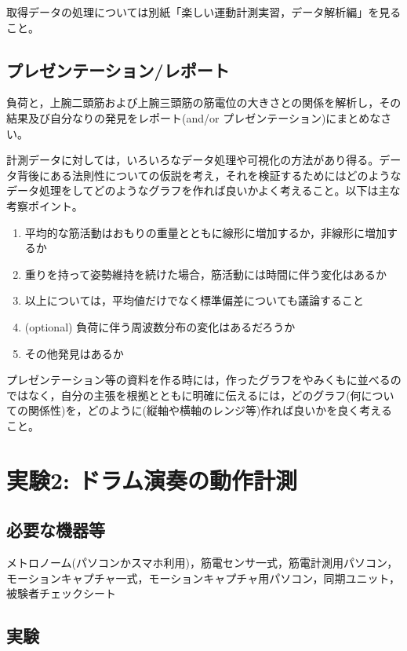 \documentclass{jsarticle}
\begin{document}
取得データの処理については別紙「楽しい運動計測実習，データ解析編」を見ること。

\subsection{プレゼンテーション/レポート}

負荷と，上腕二頭筋および上腕三頭筋の筋電位の大きさとの関係を解析し，その結果及び自分なりの発見をレポート(and/or プレゼンテーション)にまとめなさい。

計測データに対しては，いろいろなデータ処理や可視化の方法があり得る。データ背後にある法則性についての仮説を考え，それを検証するためにはどのようなデータ処理をしてどのようなグラフを作れば良いかよく考えること。以下は主な考察ポイント。

\begin{enumerate}
  \item 平均的な筋活動はおもりの重量とともに線形に増加するか，非線形に増加するか
  \item 重りを持って姿勢維持を続けた場合，筋活動には時間に伴う変化はあるか
  \item 以上については，平均値だけでなく標準偏差についても議論すること
  \item (optional) 負荷に伴う周波数分布の変化はあるだろうか
  \item その他発見はあるか
\end{enumerate}

プレゼンテーション等の資料を作る時には，作ったグラフをやみくもに並べるのではなく，自分の主張を根拠とともに明確に伝えるには，どのグラフ(何についての関係性)を，どのように(縦軸や横軸のレンジ等)作れば良いかを良く考えること。


\section{実験2: ドラム演奏の動作計測}

\subsection{必要な機器等}

メトロノーム(パソコンかスマホ利用)，筋電センサ一式，筋電計測用パソコン，モーションキャプチャ一式，モーションキャプチャ用パソコン，同期ユニット，被験者チェックシート

\subsection{実験}
\end{document}
